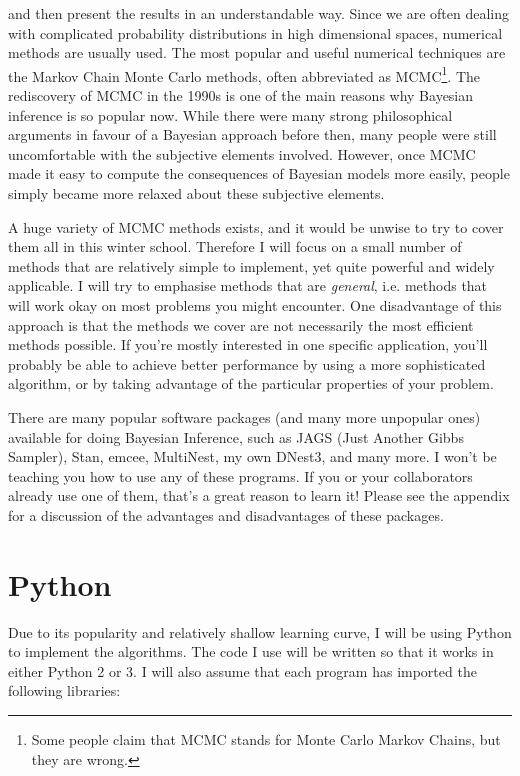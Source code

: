 and then present the results in an
understandable way. Since we are often dealing with complicated probability
distributions in high dimensional spaces, numerical methods are usually used.
The most popular and useful numerical techniques are the Markov Chain Monte
Carlo methods, often abbreviated as
MCMC\footnote{Some people claim that MCMC stands for
Monte Carlo Markov Chains, but they are wrong.}.
The rediscovery of MCMC in the 1990s
is one of the main reasons why Bayesian inference is so popular now.
While there were many strong philosophical arguments in favour of a Bayesian
approach before then, many people were still uncomfortable with the
subjective elements involved. However, once MCMC made it easy to compute the
consequences of Bayesian models more easily, people simply became more relaxed
about these subjective elements.

A huge variety of MCMC methods exists, and it would be
unwise to try to cover them all in this winter school. Therefore I will focus
on a small number of methods that are relatively simple to implement, yet quite powerful
and widely applicable. I will try to emphasise methods that are {\it general},
i.e. methods that will work okay on most problems you might encounter. One
disadvantage of this approach is that the methods we cover are not necessarily
the most efficient methods possible. If you're mostly interested in one
specific application, you'll probably be able to achieve better performance
by using a more sophisticated algorithm, or by taking advantage of the particular
properties of your problem.

There are many popular software packages (and many more unpopular ones)
available for doing Bayesian Inference, such as JAGS (Just Another Gibbs Sampler),
Stan, emcee, MultiNest, my own DNest3, and many more.
I won't be teaching you how to use any of these programs.
If you or your collaborators already use one of them, that's a great reason to
learn it! Please see the appendix for a discussion of the advantages and
disadvantages of these packages.


\section{Python}
Due to its popularity and relatively shallow learning curve,
I will be using Python to implement the algorithms. The code I use will be
written so that it works in either Python 2 or 3. I will also assume that
each program has imported the following libraries:

